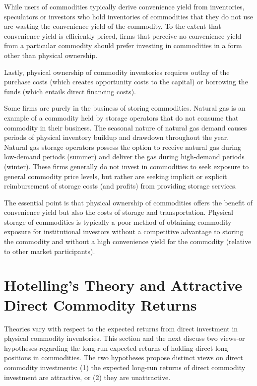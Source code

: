 \documentclass[11pt]{article}
\begin{document}
While users of commodities typically derive convenience yield from inventories, speculators or investors who hold inventories of commodities that they do not use are wasting the convenience yield of the commodity. To the extent that convenience yield is efficiently priced, firms that perceive no convenience yield from a particular commodity should prefer investing in commodities in a form other than physical ownership.

Lastly, physical ownership of commodity inventories requires outlay of the purchase costs (which creates opportunity costs to the capital) or borrowing the funds (which entails direct financing costs).

Some firms are purely in the business of storing commodities. Natural gas is an example of a commodity held by storage operators that do not consume that commodity in their business. The seasonal nature of natural gas demand causes periods of physical inventory buildup and drawdown throughout the year. Natural gas storage operators possess the option to receive natural gas during low-demand periods (summer) and deliver the gas during high-demand periods (winter). These firms generally do not invest in commodities to seek exposure to general commodity price levels, but rather are seeking implicit or explicit reimbursement of storage costs (and profits) from providing storage services.

The essential point is that physical ownership of commodities offers the benefit of convenience yield but also the costs of storage and transportation. Physical storage of commodities is typically a poor method of obtaining commodity exposure for institutional investors without a competitive advantage to storing the commodity and without a high convenience yield for the commodity (relative to other market participants).

\section*{Hotelling's Theory and Attractive Direct Commodity Returns}
Theories vary with respect to the expected returns from direct investment in physical commodity inventories. This section and the next discuss two views-or hypotheses-regarding the long-run expected returns of holding direct long positions in commodities. The two hypotheses propose distinct views on direct commodity investments: (1) the expected long-run returns of direct commodity investment are attractive, or (2) they are unattractive.
\end{document}

